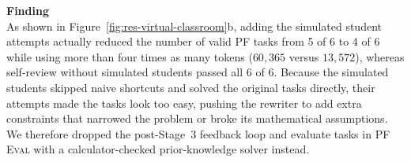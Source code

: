 \textbf{Finding}\\[0.2em]
As shown in Figure~\ref{fig:res-virtual-classroom}b, adding the simulated student attempts actually reduced the number of valid PF tasks from 5 of 6 to 4 of 6 while using more than four times as many tokens ($60{,}365$ versus $13{,}572$), whereas self-review without simulated students passed all 6 of 6. Because the simulated students skipped naive shortcuts and solved the original tasks directly, their attempts made the tasks look too easy, pushing the rewriter to add extra constraints that narrowed the problem or broke its mathematical assumptions. We therefore dropped the post-Stage~3 feedback loop and evaluate tasks in \textsc{PF Eval} with a calculator-checked prior-knowledge solver instead.
